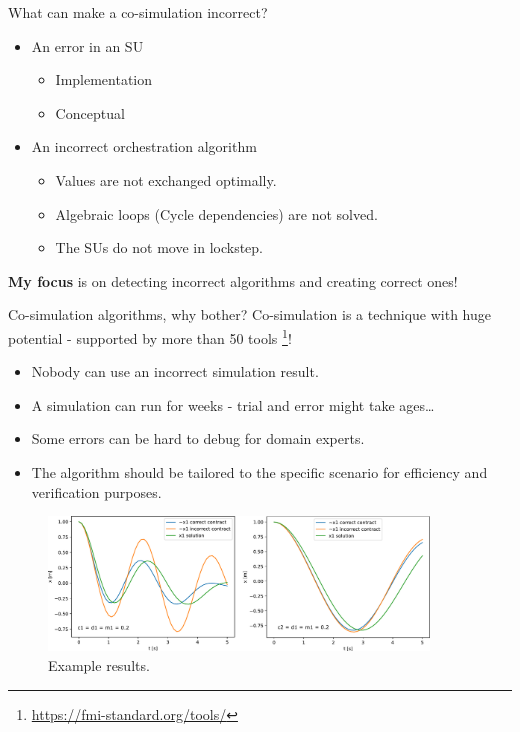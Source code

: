 \documentclass{beamer}
\begin{document}
\begin{frame}{What can make a co-simulation incorrect?}
    \begin{itemize}
        \item An error in an SU
        \begin{itemize}
            \item Implementation
            \item Conceptual
        \end{itemize}
        \item An incorrect orchestration algorithm
        \begin{itemize}
            \item Values are not exchanged optimally.
            \item Algebraic loops (Cycle dependencies) are not solved.
            \item The SUs do not move in lockstep.
        \end{itemize}
    \end{itemize}
    \textbf{My focus} is on detecting incorrect algorithms and creating correct ones!
\end{frame}

\begin{frame}{Co-simulation algorithms, why bother?}
    Co-simulation is a technique with huge potential - supported by more than 50 tools \footnote{\url{https://fmi-standard.org/tools/}}!
    \begin{itemize}
        \item Nobody can use an incorrect simulation result.
        \item A simulation can run for weeks - trial and error might take ages\dots
        \item Some errors can be hard to debug for domain experts. 
        \item The algorithm should be tailored to the specific scenario for efficiency and verification purposes.
    \end{itemize}

    \begin{figure}[htb]
        \centering
          \includegraphics[width=0.9\textwidth]{images/merged_results_inkscape}
          \caption{Example results.}
          \label{fig:merged_results_inkscape}
      \end{figure}
\end{frame}
\end{document}
